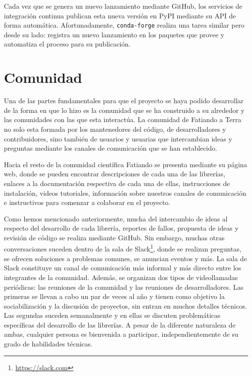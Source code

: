 Cada vez que se genera un nuevo lanzamiento mediante GitHub,
los servicios de integración continua publican esta nueva versión en PyPI
mediante su \ac{API} de forma automática.
Afortunadamente, \texttt{conda-forge} realiza una tarea similar pero desde su
lado: registra un nuevo lanzamiento en los paquetes que provee y automatiza el
proceso para su publicación.


\section{Comunidad}

Una de las partes fundamentales para que el proyecto se haya podido desarrollar
de la forma en que lo hizo es la comunidad que se ha construido a su alrededor
y las comunidades con las que esta interactúa.
La comunidad de Fatiando a Terra no solo esta formada por los mantenedores del
código, de desarrolladores y contribuidores, sino también de usuarios
y usuarias que intercambian ideas y preguntas mediante los canales de
comunicación que se han establecido.

Hacia el resto de la comunidad científica Fatiando se presenta mediante su
página web, donde se pueden encontrar descripciones de cada una de las
librerías, enlaces a la documentación respectiva de cada una de ellas,
instrucciones de instalación, videos tutoriales, información sobre nuestros
canales de comunicación e instructivos para comenzar a colaborar en el
proyecto.

Como hemos mencionado anteriormente, mucha del intercambio de ideas al respecto
del desarrollo de cada librería, reportes de fallos, propuesta de ideas
y revisión de código se realiza mediante GitHub.
Sin embargo, muchas otras conversaciones suceden dentro de la sala de
Slack\footnote{\url{https://slack.com}}, donde se realizan preguntas, se
ofrecen soluciones a problemas comunes, se anuncian eventos y más.
La sala de Slack constituye un canal de comunicación más informal y más
directo entre los integrantes de la comunidad.
Además, se organizan dos tipos de videollamadas periódicas: las reuniones de la
comunidad y las reuniones de desarrolladores.
Las primeras se llevan a cabo un par de veces al año y tienen como objetivo la
sociabilización y la discusión de proyectos, sin entran en muchos detalles
técnicos.
Las segundas suceden semanalmente y en ellas se discuten problemáticas
específicas del desarrollo de las librerías.
A pesar de la diferente naturaleza de ambas, cualquier persona es bienvenida
a participar, independientemente de su grado de habilidades técnicas.

